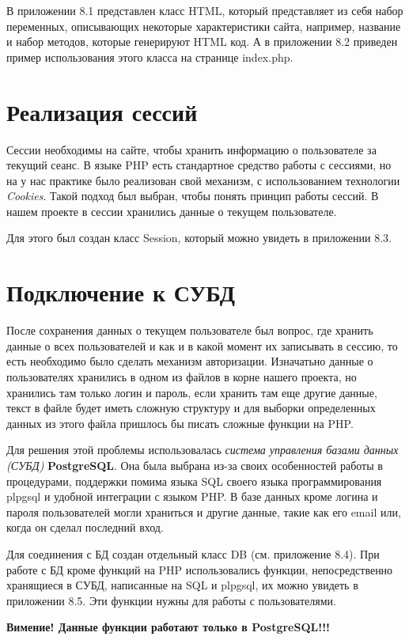 \documentclass[a4paper]{article}
\begin{document}
В приложении 8.1 представлен класс HTML, который представляет из себя набор переменных, описывающих некоторые характеристики сайта, например, название и набор методов, которые генерируют HTML код. А в приложении 8.2 приведен пример использования этого класса на странице index.php.

\section{Реализация сессий}
Сессии необходимы на сайте, чтобы хранить информацию о пользователе за текущий сеанс. В языке PHP есть стандартное средство работы с сессиями, но на у нас практике было реализован свой механизм, с использованием технологии \textit{Cookies}. Такой подход был выбран, чтобы понять принцип работы сессий. В нашем проекте в сессии хранились данные о текущем пользователе.

Для этого был создан класс Session, который можно увидеть в приложении 8.3.

\section{Подключение к СУБД}
После сохранения данных о текущем пользователе был вопрос, где хранить данные о всех пользователей и как и в какой момент их записывать в сессию, то есть необходимо было сделать механизм авторизации. Изначатьно данные о пользователях хранились в одном из файлов в корне нашего проекта, но хранились там только логин и пароль, если хранить там еще другие данные, текст в файле будет иметь сложную структуру и для выборки определенных данных из этого файла пришлось бы писать сложные функции на PHP.

Для решения этой проблемы использовалась \textit{система управления базами данных (СУБД)} \textbf{PostgreSQL}. Она была выбрана из-за своих особенностей работы в процедурами, поддержки помима языка SQL своего языка программирования plpgsql и удобной интеграции с языком PHP. В базе данных кроме логина и пароля пользователей могли храниться и другие данные, такие как его email или, когда он сделал последний вход.

Для соединения с БД создан отдельный класс DB (см. приложение 8.4). При работе с БД кроме функций на PHP использовались функции, непосредственно хранящиеся в СУБД, написанные на SQL и plpgsql, их можно увидеть в приложении 8.5. Эти функции нужны для работы с пользователями.

\textbf{Вимение! Данные функции работают только в PostgreSQL!!!}
\end{document}
